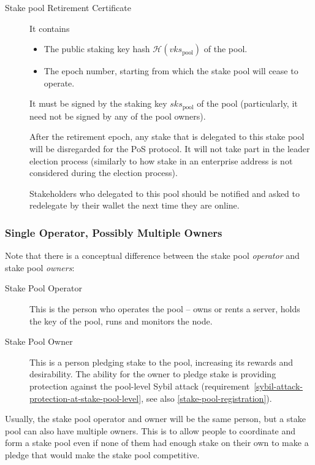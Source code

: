 \documentclass[11pt,a4paper]{article}
\begin{document}
\begin{description}
\item[Stake pool Retirement Certificate]
It contains

\begin{itemize}
\item
  The public staking key hash \(\mathcal{H}(vks_\text{pool})\) of the
  pool.
\item
  The epoch number, starting from which the stake pool will cease to
  operate.
\end{itemize}

It must be signed by the staking key \(sks_\text{pool}\) of the pool
(particularly, it need not be signed by any of the pool owners).

After the retirement epoch, any stake that is delegated to this stake
pool will be disregarded for the PoS protocol. It will not take part in
the leader election process (similarly to how stake in an enterprise
address is not considered during the election process).

Stakeholders who delegated to this pool should be notified and asked to
redelegate by their wallet the next time they are online.
\end{description}

\subsubsection{Single Operator, Possibly Multiple Owners}
\label{multiple-owners}

Note that there is a conceptual difference between the stake pool
\emph{operator} and stake pool \emph{owners}:
\begin{description}
\item[Stake Pool Operator] This is the person who operates the pool -- owns or
  rents a server, holds the key of the pool, runs and monitors the
  node.
\item[Stake Pool Owner] This is a person pledging stake
  to the pool, increasing its rewards and desirability. The ability
  for the owner to pledge stake is providing protection against the
  pool-level Sybil attack
  (requirement~\ref{sybil-attack-protection-at-stake-pool-level}, see
  also \cref{stake-pool-registration}).
\end{description}

Usually, the stake pool operator and owner will be the same person,
but a stake pool can also have multiple owners. This is to allow
people to coordinate and form a stake pool even if none of them had
enough stake on their own to make a pledge that would make the stake
pool competitive.
\end{document}
